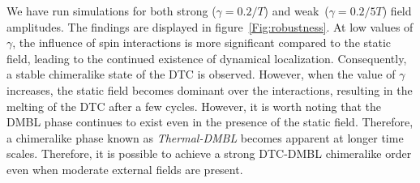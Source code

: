 \documentclass[12pt]{iopart}
\begin{document}
We have run simulations for both strong ($\gamma=0.2/T$) and weak ($ \gamma= 0.2/5T$) field amplitudes. The findings are displayed in figure~\ref{Fig:robustness}. At low values of $\gamma$, the influence of spin interactions is more significant compared to the static field, leading to the continued existence of dynamical localization. Consequently, a stable chimeralike state of the DTC is observed. However, when the value of $\gamma$ increases, the static field becomes dominant over the interactions, resulting in the melting of the DTC after a few cycles. However, it is worth noting that the DMBL phase continues to exist even in the presence of the static field. Therefore, a chimeralike phase known as \textit{Thermal-DMBL} becomes apparent at longer time scales. Therefore, it is possible to achieve a strong DTC-DMBL chimeralike order even when moderate external fields are present.
	
\end{document}

